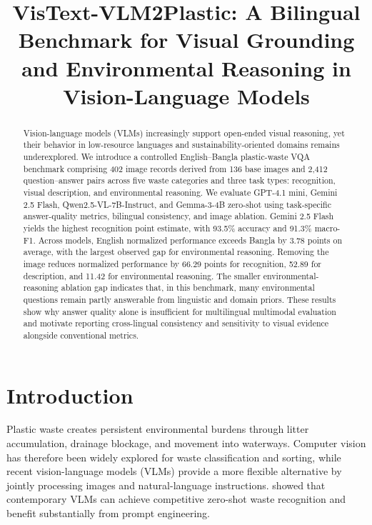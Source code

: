 \documentclass{article}
\title{VisText-VLM2Plastic: A Bilingual Benchmark for Visual Grounding and Environmental Reasoning in Vision-Language Models}
\begin{document}
\maketitle


\begin{abstract}
Vision-language models (VLMs) increasingly support open-ended visual reasoning, yet their behavior in low-resource languages and sustainability-oriented domains remains underexplored. We introduce a controlled English--Bangla plastic-waste VQA benchmark comprising 402 image records derived from 136 base images and 2,412 question--answer pairs across five waste categories and three task types: recognition, visual description, and environmental reasoning. We evaluate GPT-4.1 mini, Gemini 2.5 Flash, Qwen2.5-VL-7B-Instruct, and Gemma-3-4B zero-shot using task-specific answer-quality metrics, bilingual consistency, and image ablation. Gemini 2.5 Flash yields the highest recognition point estimate, with 93.5\% accuracy and 91.3\% macro-F1. Across models, English normalized performance exceeds Bangla by 3.78 points on average, with the largest observed gap for environmental reasoning. Removing the image reduces normalized performance by 66.29 points for recognition, 52.89 for description, and 11.42 for environmental reasoning. The smaller environmental-reasoning ablation gap indicates that, in this benchmark, many environmental questions remain partly answerable from linguistic and domain priors. These results show why answer quality alone is insufficient for multilingual multimodal evaluation and motivate reporting cross-lingual consistency and sensitivity to visual evidence alongside conventional metrics.
\end{abstract}

\section{Introduction}
\label{sec:introduction}

Plastic waste creates persistent environmental burdens through litter accumulation, drainage blockage, and movement into waterways. Computer vision has therefore been widely explored for waste classification and sorting, while recent vision-language models (VLMs) provide a more flexible alternative by jointly processing images and natural-language instructions. \citet{malla2025wasterecognition} showed that contemporary VLMs can achieve competitive zero-shot waste recognition and benefit substantially from prompt engineering.
\end{document}
